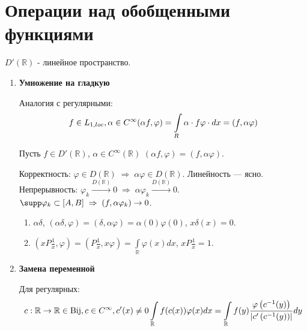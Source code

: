 \section{Операции над обобщенными функциями}

\(D'  (\mathbb{R} )\) - линейное пространство.

\begin{enumerate}
\def\labelenumi{\arabic{enumi}.}
\item
  \textbf{Умножение на гладкую}

  Аналогия с регулярными: \[
  f\in L_{1, loc}, \alpha  \in  C^\infty  \\
  (\alpha f, \varphi ) = \int\limits_R \alpha \cdot f\varphi \cdot dx=(f, \alpha \varphi )
  \]

  \begin{definition}

  Пусть \(f  \in  D'  (\mathbb{R} )\),
  \(\alpha   \in  C^{\infty }  (\mathbb{R} )\)
  \((\alpha  f, \varphi )  =  (f, \alpha  \varphi )\).

  \end{definition}

  Корректность:
  \(\varphi   \in  D  (\mathbb{R} )  \;  \Rightarrow   \; \alpha  \varphi   \in  D  (\mathbb{R} )\).
  Линейность --- ясно. Непрерывность:
  \(\varphi _{k}  \xrightarrow{D  (\mathbb{R} )}  0  \;  \Rightarrow   \; \alpha  \varphi _{k}  \xrightarrow{D  (\mathbb{R} )}  0\).
  \(\supp \varphi _{k}  \subset   [A, B]  \;  \Rightarrow   \;  (f, \alpha  \varphi _{k})  \rightarrow   0\).

  \begin{example}

  \begin{enumerate}
  \def\labelenumii{\arabic{enumii}.}
  \item
    \(\alpha  \delta \),
    \((\alpha  \delta , \varphi )  =  (\delta , \alpha  \varphi )  = \alpha (0) \varphi (0)\),
    \(x \delta   (x)  =  0\).
  \item
    \(\left(x P\frac{1}{x}, \varphi \right)  =  \left(P\frac{1}{x}, x \varphi \right)  =  \int \limits_{\mathbb{R} } \varphi (x) d x\),
    \(x P\frac{1}{x}  =  1\).
  \end{enumerate}

  \end{example}
\item
  \textbf{Замена переменной}

  Для регулярных: \[
  c: \mathbb{R} \rightarrow \mathbb{R} \in \operatorname{Bij}, c \in  C^\infty , c'(x) \neq   0\\
  \int \limits_\mathbb{R} f(c(x))\varphi (x)dx =\int \limits_\mathbb{R} f(y)\frac{\varphi   \left(c^{-   1}  (y)\right)}{\left|c'  \left(c^{-   1}  (y)\right)\right|}dy
  \]


\end{enumerate}
